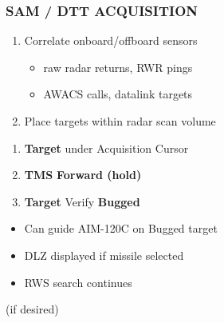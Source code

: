 \subsubsection{SAM / DTT ACQUISITION}
\label{subsec:rws:samdttacq}
\begin{checklistenumerate}
    \begin{enumerate}
        \item Correlate onboard/offboard sensors
        \begin{itemize}
            \item raw radar returns, RWR pings
            \item AWACS calls, datalink targets
        \end{itemize}
        \item Place targets within radar scan volume
    \end{enumerate}
    \begin{enumerate}
        \item \textbf{Target} \dotfill under Acquisition Cursor
        \item \textbf{TMS} \dotfill \textbf{Forward (hold)}
        \item \textbf{Target} \dotfill Verify \textbf{Bugged}
    \end{enumerate}
    \begin{itemize}
        \item Can guide AIM-120C on Bugged target
        \item DLZ displayed if missile selected
        \item RWS search continues
    \end{itemize}
     (if desired)
    \marginpar{
        \captionsetup{type=figure}
        \centering
        \begin{tikzpicture}[figstyle]
            

\end{tikzpicture}}
\end{checklistenumerate}
